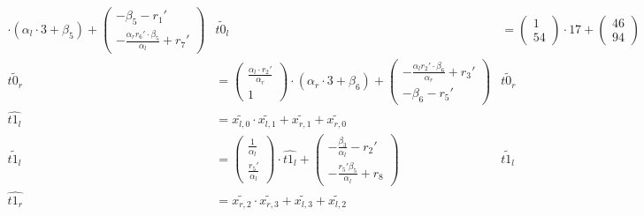 \begin{align*}
\cdot (\alpha_l \cdot 3 + \beta_5) +
\begin{pmatrix}
  -\beta_5-r_1'\\
  -\frac{\alpha_r r_6' \cdot \beta_5}{\alpha_l} + r_7'
\end{pmatrix}
&
\widetilde{t0_l} & =
\begin{pmatrix}1\\54\end{pmatrix}
\cdot 17 +
\begin{pmatrix}46\\94\end{pmatrix}\\
%
\widetilde{t0_r} & =
\begin{pmatrix}
  \frac{\alpha_l \cdot r_2'}{\alpha_r}\\
  1
\end{pmatrix}
\cdot (\alpha_r \cdot 3 + \beta_6) +
\begin{pmatrix}
  -\frac{\alpha_lr_2' \cdot \beta_6}{\alpha_r} + r_3'\\
  -\beta_6-r_5'
\end{pmatrix}
&
\widetilde{t0_r} & =
\begin{pmatrix}2\\1\end{pmatrix}
\cdot 26 +
\begin{pmatrix}79\\37\end{pmatrix}\\
%
\widehat{t1_l} &=
\widetilde{x_{l,0}} \cdot \widetilde{x_{l,1}} + \widetilde{x_{r,1}} +
\widetilde{x_{r,0}}\\
%
\widetilde{t1_l} &=
\begin{pmatrix}\frac{1}{\alpha_l}\\\frac{r_5'}{\alpha_l}\end{pmatrix}
\cdot \widehat{t1_l} +
\begin{pmatrix}-\frac{\beta_3}{\alpha_l}-r_2'\\-\frac{r_5'\beta_5}{\alpha_l} +
r_8\end{pmatrix}
&
\widetilde{t1_l} &=
\begin{pmatrix}31\\6\end{pmatrix}
\cdot \widehat{t1_l} +
\begin{pmatrix}59\\59\end{pmatrix}\\
%
\widehat{t1_r} &=
\widetilde{x_{r,2}} \cdot \widetilde{x_{r,3}} + \widetilde{x_{l,3}} +
\widetilde{x_{l,2}} \\

\end{align*}
